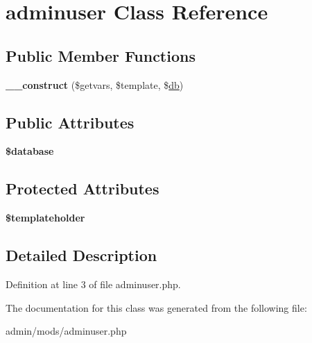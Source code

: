 \hypertarget{classadminuser}{\section{adminuser Class Reference}
\label{classadminuser}
}
\subsection*{Public Member Functions}
\begin{DoxyCompactItemize}
\item 
\hypertarget{classadminuser_a023621037bd64b0fc4f28bb051d0eaf9}{{\bfseries \-\_\-\-\_\-construct} (\$getvars, \$template, \$\hyperlink{classdb}{db})}\label{classadminuser_a023621037bd64b0fc4f28bb051d0eaf9}

\end{DoxyCompactItemize}
\subsection*{Public Attributes}
\begin{DoxyCompactItemize}
\item 
\hypertarget{classadminuser_a13271febb31a709aa5a26f5069c15acc}{{\bfseries \$database}}\label{classadminuser_a13271febb31a709aa5a26f5069c15acc}

\end{DoxyCompactItemize}
\subsection*{Protected Attributes}
\begin{DoxyCompactItemize}
\item 
\hypertarget{classadminuser_aaa7c2068ee100d11b2cdaecf5ca9bcf9}{{\bfseries \$templateholder}}\label{classadminuser_aaa7c2068ee100d11b2cdaecf5ca9bcf9}

\end{DoxyCompactItemize}


\subsection{Detailed Description}


Definition at line 3 of file adminuser.\-php.



The documentation for this class was generated from the following file\-:\begin{DoxyCompactItemize}
\item 
admin/mods/adminuser.\-php\end{DoxyCompactItemize}
